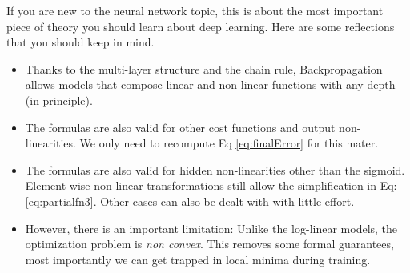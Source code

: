 If you are new to the neural network topic, this is about the most important
piece of theory you should learn about deep learning. Here are some reflections
that you should keep in mind.

\begin{itemize}
\item Thanks to the multi-layer structure and the chain rule, Backpropagation allows models that compose linear and non-linear functions with any depth (in principle\footnotemark). 
\item The formulas are also valid for other cost functions and output non-linearities. We only need to recompute Eq \ref{eq:finalError} for this mater.  
\item The formulas are also valid for hidden non-linearities other than the sigmoid. Element-wise non-linear transformations still allow the simplification in Eq: \ref{eq:partialfn3}. Other cases can also be dealt with with little effort.
\item However, there is an important limitation: Unlike the log-linear models, the optimization problem is \textit{non convex}. This removes some formal guarantees, most importantly we can get trapped in local minima during training.
\end{itemize}


%
%
%

